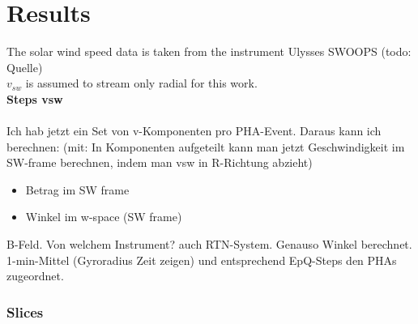 
\chapter{Results} %

\label{chap:results} %
The solar wind speed data is taken from the instrument Ulysses SWOOPS (todo: Quelle)\\
$v_{sw}$ is assumed to stream only radial for this work.\\
\textbf{Steps vsw} \\ \\
Ich hab jetzt ein Set von v-Komponenten pro PHA-Event. Daraus kann ich berechnen:
(mit: In Komponenten aufgeteilt kann man jetzt Geschwindigkeit im SW-frame berechnen, indem man vsw in R-Richtung abzieht)
\begin{itemize}
	\item Betrag im SW frame
	\item Winkel im w-space (SW frame)
\end{itemize}
B-Feld. Von welchem Instrument? auch RTN-System. Genauso Winkel berechnet.\\
1-min-Mittel (Gyroradius Zeit zeigen) und entsprechend EpQ-Steps den PHAs zugeordnet.
\subsection{Slices}

%
%
%
